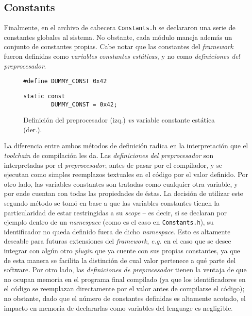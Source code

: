 \subsection{Constants}

Finalmente, en el archivo de cabecera \texttt{Constants.h} se declararon una serie de constantes globales al sistema. No obstante, cada módulo maneja además un conjunto de constantes propias. Cabe notar que las constantes del \emph{framework} fueron definidas como \emph{variables constantes estáticas}, y no como \emph{definiciones del preprocesador}.

\begin{figure}[h]
    \centering
    \begin{minipage}{.49\linewidth}
        \begin{lstlisting}[style=CPP, numbers=none, frame=none, backgroundcolor=\color{white}]
        #define DUMMY_CONST 0x42
        \end{lstlisting}
    \end{minipage}
    \begin{minipage}{.49\linewidth}
        \begin{lstlisting}[style=CPP, numbers=none, frame=l, backgroundcolor=\color{white}]
        static const
        DUMMY_CONST = 0x42;
        \end{lstlisting}
    \end{minipage}
    \caption{Definición del preprocesador (izq.) \emph{vs} variable constante estática (der.).}
\end{figure}

La diferencia entre ambos métodos de definición radica en la interpretación que el \emph{toolchain} de compilación les da. Las \emph{definiciones del preprocesador} son interpretadas por el \emph{preprocesador}, antes de pasar por el compilador, y se ejecutan como simples reemplazos textuales en el código por el valor definido. Por otro lado, las variables constantes son tratadas como cualquier otra variable, y por ende cuentan con todas las propiedades de éstas. La decisión de utilizar este segundo método se tomó en base a que las variables constantes tienen la particularidad de estar restringidas a su \emph{scope} -- es decir, si se declaran por ejemplo dentro de un \emph{namespace} (como es el caso en \texttt{Constants.h}), su identificador no queda definido fuera de dicho \emph{namespace}.
Esto es altamente deseable para futuras extensiones del \emph{framework}, \emph{e.g.} en el caso que se desee integrar con algún otro \emph{plugin} que ya cuente con sus propias constantes, ya que de esta manera se facilita la distinción de cual valor pertenece a qué parte del software. Por otro lado, las \emph{definiciones de preprocesador} tienen la ventaja de que no ocupan memoria en el programa final compilado (ya que los identificadores en el código se reemplazan directamente por el valor antes de compilarse el código); no obstante, dado que el número de constantes definidas es altamente acotado, el impacto en memoria de declararlas como variables del lenguage es negligible.